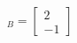 \documentclass[preview]{standalone}
\begin{document}
\begin{align*}
[\vec x]_B=\begin{bmatrix}2\\-1\end{bmatrix}
\end{align*}
\end{document}
